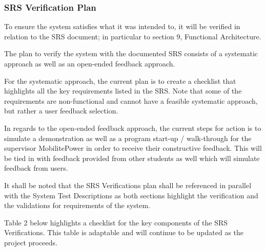 \documentclass[12pt, titlepage]{article}
\begin{document}
\subsubsection{SRS Verification Plan}
To ensure the system satisfies what it was intended to, it will be verified in relation to the SRS document; in particular to section 9, Functional Architecture.
\par
The plan to verify the system with the documented SRS consists of a systematic approach as well as an open-ended feedback approach.
\par
For the systematic approach, the current plan is to create a checklist that highlights all the key requirements listed in the SRS. Note that some of the requirements are non-functional and cannot have a feasible systematic approach, but rather a user feedback selection.
\par
In regards to the open-ended feedback approach, the current steps for action is to simulate a demonstration as well as a program start-up / walk-through for the supervisor MobilitePower in order to receive their constructive feedback. This will be tied in with feedback provided from other students as well which will simulate feedback from users. 
\par
It shall be noted that the SRS Verifications plan shall be referenced in parallel with the System Test Descriptions as both sections highlight the verification and the validations for requirements of the system. 
\par
Table 2 below highlights a checklist for the key components of the SRS Verifications. This table is adaptable and will continue to be updated as the project proceeds.
\newpage
\fancyhf{}
\fancyhead[C]{\thepage}
\renewcommand{\headrulewidth}{0pt}
\pagestyle{fancy}
\end{document}
